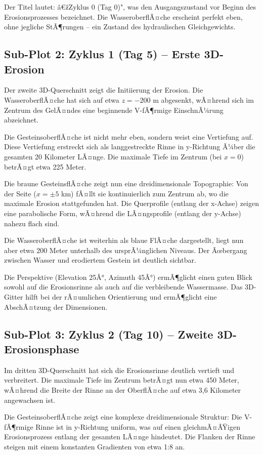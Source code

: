 ﻿\documentclass[12pt,a4paper]{report}
\begin{document}
Der Titel lautet: â€žZyklus 0 (Tag 0)", was den Ausgangszustand vor Beginn des Erosionsprozesses bezeichnet. Die WasseroberflÃ¤che erscheint perfekt eben, ohne jegliche StÃ¶\-rungen -- ein Zustand des hydraulischen Gleichgewichts.

\subsection{Sub-Plot 2: Zyklus 1 (Tag 5) -- Erste 3D-Erosion}

Der zweite 3D-Querschnitt zeigt die Initiierung der Erosion. Die WasseroberflÃ¤che hat sich auf etwa $z = -200$ m abgesenkt, wÃ¤hrend sich im Zentrum des GelÃ¤ndes eine beginnende V-fÃ¶rmige EinschnÃ¼rung abzeichnet.

Die GesteinsoberflÃ¤che ist nicht mehr eben, sondern weist eine Vertiefung auf. Diese Vertiefung erstreckt sich als langgestreckte Rinne in y-Richtung Ã¼ber die gesamten 20 Kilometer LÃ¤nge. Die maximale Tiefe im Zentrum (bei $x = 0$) betrÃ¤gt etwa 225 Meter.

Die braune GesteinsflÃ¤che zeigt nun eine dreidimensionale Topographie: Von der Seite ($x = \pm 5$ km) fÃ¤llt sie kontinuierlich zum Zentrum ab, wo die maximale Erosion stattgefunden hat. Die Querprofile (entlang der x-Achse) zeigen eine parabolische Form, wÃ¤hrend die LÃ¤ngsprofile (entlang der y-Achse) nahezu flach sind.

Die WasseroberflÃ¤che ist weiterhin als blaue FlÃ¤che dargestellt, liegt nun aber etwa 200 Meter unterhalb des ursprÃ¼nglichen Niveaus. Der Ãœbergang zwischen Wasser und erodiertem Gestein ist deutlich sichtbar.

Die Perspektive (Elevation 25Â°, Azimuth 45Â°) ermÃ¶glicht einen guten Blick sowohl auf die Erosionsrinne als auch auf die verbleibende Wassermasse. Das 3D-Gitter hilft bei der rÃ¤umlichen Orientierung und ermÃ¶glicht eine AbschÃ¤tzung der Dimensionen.

\subsection{Sub-Plot 3: Zyklus 2 (Tag 10) -- Zweite 3D-Erosionsphase}

Im dritten 3D-Querschnitt hat sich die Erosionsrinne deutlich vertieft und verbreitert. Die maximale Tiefe im Zentrum betrÃ¤gt nun etwa 450 Meter, wÃ¤hrend die Breite der Rinne an der OberflÃ¤che auf etwa 3,6 Kilometer angewachsen ist.

Die GesteinsoberflÃ¤che zeigt eine komplexe dreidimensionale Struktur: Die V-fÃ¶rmige Rinne ist in y-Richtung uniform, was auf einen gleichmÃ¤ÃŸigen Erosionsprozess entlang der gesamten LÃ¤nge hindeutet. Die Flanken der Rinne steigen mit einem konstanten Gradienten von etwa 1:8 an.
\end{document}
